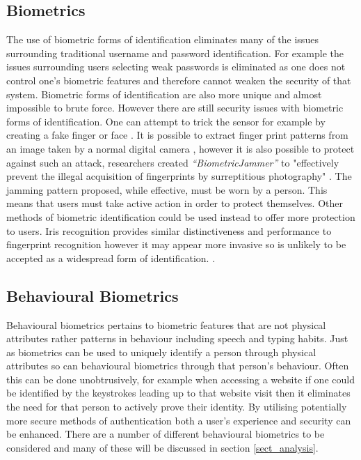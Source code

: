 \documentclass[12pt]{article}
\begin{document}
	\subsection{Biometrics}
	\label{subsect_biometrics}
	The use of biometric forms of identification eliminates many of the issues surrounding traditional username and password identification. For example the issues surrounding users selecting weak passwords is eliminated as one does not control one's biometric features and therefore cannot weaken the security of that system. Biometric forms of identification are also more unique and almost impossible to brute force.
	However there are still security issues with biometric forms of identification. One can attempt to trick the sensor for example by creating a fake finger or face \citep{ambalakat2005security}. It is possible to extract finger print patterns from an image taken by a normal digital camera \citep{ogane2017biometric}, however it is also possible to protect against such an attack, researchers created \emph{``BiometricJammer''} to "effectively prevent the illegal acquisition of fingerprints by surreptitious photography" \citep{ogane2017biometric}. The jamming pattern proposed, while effective, must be worn by a person. This means that users must take active action in order to protect themselves. Other methods of biometric identification could be used instead to offer more protection to users.
	Iris recognition provides similar distinctiveness and performance to fingerprint recognition however it may appear more invasive so is unlikely to be accepted as a widespread form of identification. \citep{ambalakat2005security}.
	\subsection{Behavioural Biometrics}
	\label{subsect_behavioral_biometrics}
	Behavioural biometrics pertains to biometric features that are not physical attributes rather patterns in behaviour including speech and typing habits. Just as biometrics can be used to uniquely identify a person through physical attributes so can behavioural biometrics through that person's behaviour. Often this can be done unobtrusively, for example when accessing a website if one could be identified by the keystrokes leading up to that website visit then it eliminates the need for that person to actively prove their identity. By utilising potentially more secure methods of authentication both a user's experience and security can be enhanced. There are a number of different behavioural biometrics to be considered and many of these will be discussed in section \ref{sect_analysis}.
	
\end{document}
